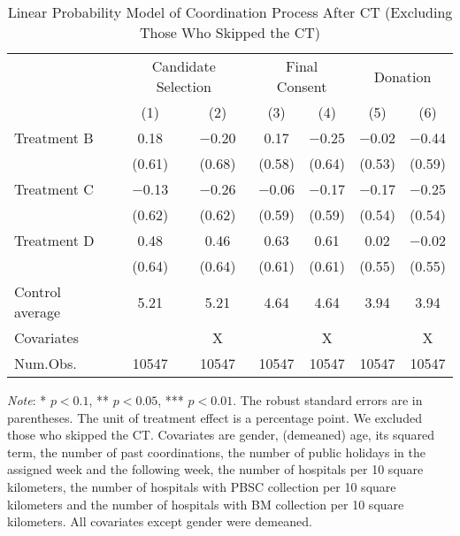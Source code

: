 \documentclass[12pt, a4paper]{article}
\begin{document}
\begin{table}[H]

\caption{\label{tab:lm-coordinate-noskip}Linear Probability Model of Coordination Process After CT (Excluding Those Who Skipped the CT)}
\centering
\fontsize{8}{10}\selectfont
\begin{threeparttable}
\begin{tabular}[t]{lcccccc}
\toprule
\multicolumn{1}{c}{ } & \multicolumn{2}{c}{Candidate Selection} & \multicolumn{2}{c}{Final Consent} & \multicolumn{2}{c}{Donation} \\
\cmidrule(l{3pt}r{3pt}){2-3} \cmidrule(l{3pt}r{3pt}){4-5} \cmidrule(l{3pt}r{3pt}){6-7}
  & (1) & (2) & (3) & (4) & (5) & (6)\\
\midrule
Treatment B & \num{0.18} & \num{-0.20} & \num{0.17} & \num{-0.25} & \num{-0.02} & \num{-0.44}\\
 & (\num{0.61}) & (\num{0.68}) & (\num{0.58}) & (\num{0.64}) & (\num{0.53}) & (\num{0.59})\\
Treatment C & \num{-0.13} & \num{-0.26} & \num{-0.06} & \num{-0.17} & \num{-0.17} & \num{-0.25}\\
 & (\num{0.62}) & (\num{0.62}) & (\num{0.59}) & (\num{0.59}) & (\num{0.54}) & (\num{0.54})\\
Treatment D & \num{0.48} & \num{0.46} & \num{0.63} & \num{0.61} & \num{0.02} & \num{-0.02}\\
 & (\num{0.64}) & (\num{0.64}) & (\num{0.61}) & (\num{0.61}) & (\num{0.55}) & (\num{0.55})\\
\midrule
Control average & 5.21 & 5.21 & 4.64 & 4.64 & 3.94 & 3.94\\
Covariates &  & X &  & X &  & X\\
Num.Obs. & \num{10547} & \num{10547} & \num{10547} & \num{10547} & \num{10547} & \num{10547}\\
\bottomrule
\end{tabular}
\begin{tablenotes}
\item \emph{Note}: * $p < 0.1$, ** $p < 0.05$, *** $p < 0.01$. The robust standard errors are in parentheses. The unit of treatment effect is a percentage point. We excluded those who skipped the CT. Covariates are gender, (demeaned) age, its squared term, the number of past coordinations, the number of public holidays in the assigned week and the following week, the number of hospitals per 10 square kilometers, the number of hospitals with PBSC collection per 10 square kilometers and the number of hospitals with BM collection per 10 square kilometers. All covariates except gender were demeaned.
\end{tablenotes}
\end{threeparttable}
\end{table}
\end{document}
